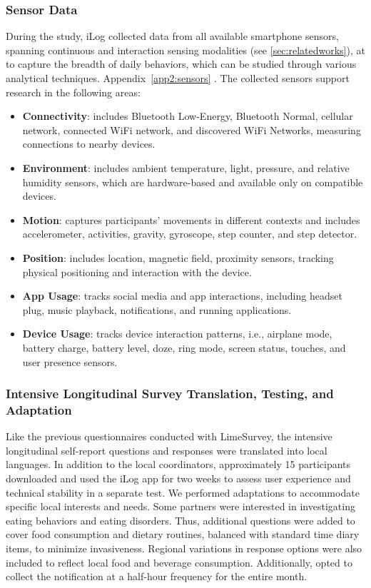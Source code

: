 \subsubsection{Sensor Data} 
During the study, iLog collected data from all available smartphone sensors, spanning continuous and interaction sensing modalities (see \cref{sec:relatedworks}), at  to capture the breadth of daily behaviors, which can be studied through various analytical techniques. Appendix~\ref{app2:sensors} . The collected sensors support research in the following areas:
%
\begin{itemize}
\item \textbf{Connectivity}: includes Bluetooth Low-Energy, Bluetooth Normal, cellular network, connected WiFi network, and discovered WiFi Networks, measuring connections to nearby devices.
\item \textbf{Environment}: includes ambient temperature, light, pressure, and relative humidity sensors, which are hardware-based and available only on compatible devices.
\item \textbf{Motion}: captures participants' movements in different contexts and includes accelerometer, activities, gravity, gyroscope, step counter, and step detector.
\item \textbf{Position}: includes location, magnetic field, proximity sensors, tracking physical positioning and interaction with the device.
\item \textbf{App Usage}: tracks social media and app interactions, including headset plug, music playback, notifications, and running applications.
\item \textbf{Device Usage}: tracks device interaction patterns, i.e., airplane mode, battery charge, battery level, doze, ring mode, screen status, touches, and user presence sensors.
\end{itemize}

\subsubsection{Intensive Longitudinal Survey Translation, Testing, and Adaptation}
Like the previous questionnaires conducted with LimeSurvey, the intensive longitudinal self-report questions and responses were translated into local languages. In addition to the local coordinators, approximately 15 participants downloaded and used the iLog app for two weeks to assess user experience and technical stability in a separate test. We performed adaptations to accommodate specific local interests and needs. Some partners were interested in investigating eating behaviors and eating disorders. Thus, additional questions were added to cover food consumption and dietary routines, balanced with standard time diary items, to minimize invasiveness. Regional variations in response options were also included to reflect local food and beverage consumption. Additionally, \IPICYT opted to collect the notification at a half-hour frequency for the entire month.

